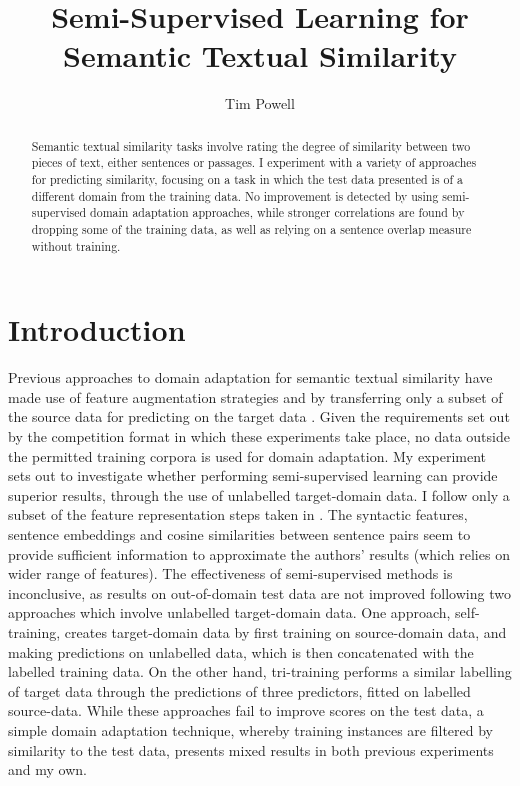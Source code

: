 \documentclass[11pt]{article}
\begin{document}
\title{Semi-Supervised Learning for Semantic Textual Similarity}

\author{Tim Powell}

\date{}
\maketitle

\begin{abstract}
Semantic textual similarity tasks involve rating the degree of similarity between two pieces of text, either sentences or passages. I experiment with a variety of approaches for predicting similarity, focusing on a task in which the test data presented is of a different domain from the training data. No improvement is detected by using semi-supervised domain adaptation approaches, while stronger correlations are found by dropping some of the training data, as well as relying on a sentence overlap measure without training. \
\end{abstract}


\section{Introduction}
 
Previous approaches to domain adaptation for semantic textual similarity have made use of feature augmentation strategies \cite{heilman2013ets} \cite{severyn2013ikernels} and by transferring only a subset of the source data for predicting on the target data \cite{arora2015dcu}. Given the requirements set out by the competition format in which these experiments take place, no data outside the permitted training corpora is used for domain adaptation. My experiment sets out to investigate whether performing semi-supervised learning can provide superior results, through the use of unlabelled target-domain data.  I follow only a subset of the feature representation steps taken in \cite{arora2015dcu}. The syntactic features, sentence embeddings and cosine similarities between sentence pairs seem to provide sufficient information to approximate the authors' results (which relies on wider range of features). The effectiveness of semi-supervised methods is inconclusive, as results on out-of-domain test data are not improved following two approaches which involve unlabelled target-domain data. One approach, self-training, creates target-domain data by first training on source-domain data, and making predictions on unlabelled data, which is then concatenated with the labelled training data. On the other hand, tri-training performs a similar labelling of target data through the predictions of three predictors, fitted on labelled source-data. While these approaches fail to improve scores on the test data, a simple domain adaptation technique, whereby training instances are filtered by similarity to the test data, presents mixed results in both previous experiments and my own.\\
\end{document}
